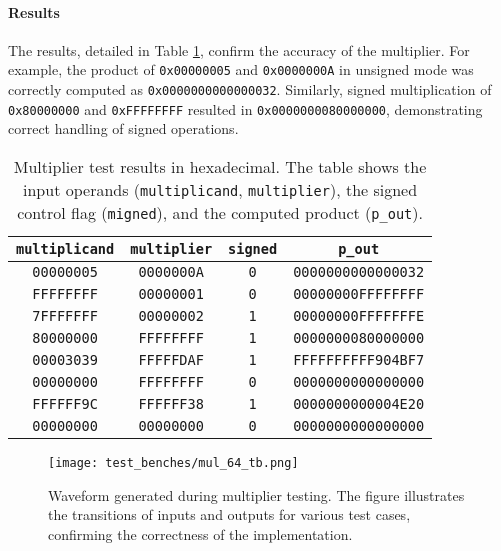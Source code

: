 \documentclass[12pt]{article}
\begin{document}
\paragraph{Results}
The results, detailed in Table \ref{tab:multiplier_results}, confirm the accuracy of the multiplier. For example, the product of \texttt{0x00000005} and \texttt{0x0000000A} in unsigned mode was correctly computed as \texttt{0x0000000000000032}. Similarly, signed multiplication of \texttt{0x80000000} and \texttt{0xFFFFFFFF} resulted in \texttt{0x0000000080000000}, demonstrating correct handling of signed operations.

\begin{table}[ht!]
    \centering
    \renewcommand{\arraystretch}{1.1}
    \setlength{\tabcolsep}{4pt}
    \begin{tabular}{|c|c|c|c|}
        \hline
        \textbf{\texttt{multiplicand}} & \textbf{\texttt{multiplier}} & \textbf{\texttt{signed}} & \textbf{\texttt{p\_out}} \\
        \hline
        \texttt{00000005} & \texttt{0000000A} & \texttt{0} & \texttt{0000000000000032} \\
        \texttt{FFFFFFFF} & \texttt{00000001} & \texttt{0} & \texttt{00000000FFFFFFFF} \\
        \texttt{7FFFFFFF} & \texttt{00000002} & \texttt{1} & \texttt{00000000FFFFFFFE} \\
        \texttt{80000000} & \texttt{FFFFFFFF} & \texttt{1} & \texttt{0000000080000000} \\
        \texttt{00003039} & \texttt{FFFFFDAF} & \texttt{1} & \texttt{FFFFFFFFFF904BF7} \\
        \texttt{00000000} & \texttt{FFFFFFFF} & \texttt{0} & \texttt{0000000000000000} \\
        \texttt{FFFFFF9C} & \texttt{FFFFFF38} & \texttt{1} & \texttt{0000000000004E20} \\
        \texttt{00000000} & \texttt{00000000} & \texttt{0} & \texttt{0000000000000000} \\
        \hline
    \end{tabular}
    \caption{Multiplier test results in hexadecimal. The table shows the input operands (\texttt{multiplicand}, \texttt{multiplier}), the signed control flag (\texttt{migned}), and the computed product (\texttt{p\_out}).}
    \label{tab:multiplier_results}
\end{table}

\begin{figure}[ht!]
    \centering
    \texttt{[image: test\_benches/mul\_64\_tb.png]}
    \caption{Waveform generated during multiplier testing. The figure illustrates the transitions of inputs and outputs for various test cases, confirming the correctness of the implementation.}
    \label{fig:multiplier_waveform}
\end{figure}
\end{document}
